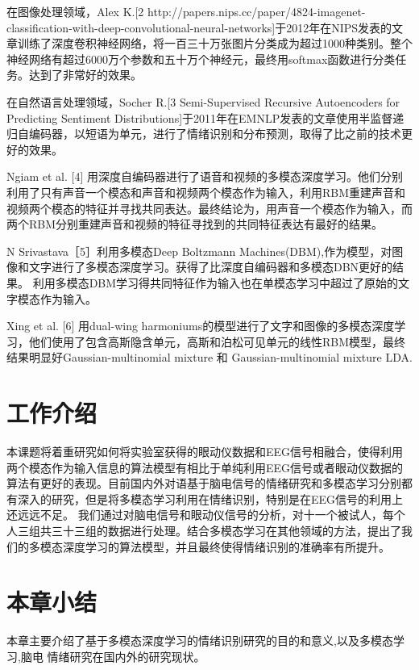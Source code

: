 	在图像处理领域，Alex K.[2 http://papers.nips.cc/paper/4824-imagenet-classification-with-deep-convolutional-neural-networks]于2012年在NIPS发表的文章训练了深度卷积神经网络，将一百三十万张图片分类成为超过1000种类别。整个神经网络有超过6000万个参数和五十万个神经元，最终用softmax函数进行分类任务。达到了非常好的效果。
	
	在自然语言处理领域，Socher R.[3 Semi-Supervised Recursive Autoencoders for Predicting Sentiment Distributions]于2011年在EMNLP发表的文章使用半监督递归自编码器，以短语为单元，进行了情绪识别和分布预测，取得了比之前的技术更好的效果。
	
	Ngiam et al. [4] 用深度自编码器进行了语音和视频的多模态深度学习。他们分别利用了只有声音一个模态和声音和视频两个模态作为输入，利用RBM重建声音和视频两个模态的特征并寻找共同表达。最终结论为，用声音一个模态作为输入，而两个RBM分别重建声音和视频的特征寻找到的共同特征表达有最好的结果。
	
	 N Srivastava［5］利用多模态Deep Boltzmann Machines(DBM),作为模型，对图像和文字进行了多模态深度学习。获得了比深度自编码器和多模态DBN更好的结果。 利用多模态DBM学习得共同特征作为输入也在单模态学习中超过了原始的文字模态作为输入。
	 
	Xing et al. [6] 用dual-wing harmoniums的模型进行了文字和图像的多模态深度学习，他们使用了包含高斯隐含单元，高斯和泊松可见单元的线性RBM模型，最终结果明显好Gaussian-multinomial mixture 和 Gaussian-multinomial mixture LDA.
	 
	 
\section{工作介绍}
	本课题将着重研究如何将实验室获得的眼动仪数据和EEG信号相融合，使得利用两个模态作为输入信息的算法模型有相比于单纯利用EEG信号或者眼动仪数据的算法有更好的表现。目前国内外对语基于脑电信号的情绪研究和多模态学习分别都有深入的研究，但是将多模态学习利用在情绪识别，特别是在EEG信号的利用上还远远不足。
	我们通过对脑电信号和眼动仪信号的分析，对十一个被试人，每个人三组共三十三组的数据进行处理。结合多模态学习在其他领域的方法，提出了我们的多模态深度学习的算法模型，并且最终使得情绪识别的准确率有所提升。
\section{本章小结}
	本章主要介绍了基于多模态深度学习的情绪识别研究的目的和意义,以及多模态学习,脑电 情绪研究在国内外的研究现状。